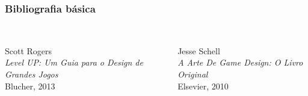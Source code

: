 \expandafter\documentclass\expandafter[table, usenames, svgnames, dvipsnames, \classopts]{beamer}
\begin{document}
\begin{frame} 
	\frametitle{\textbf{Bibliografia básica}}
	
	\begin{columns}[c]
	
			\begin{center}
				\\
				Scott Rogers\\[0.5em]
				\textit{{\large Level UP: Um Guia para o Design de Grandes Jogos}}\\[0.5em]
				{\small Blucher, 2013}
			\end{center}
			
			\begin{center}
				\\
				Jesse Schell\\[0.5em]
				\textit{{\large A Arte De Game Design: O Livro Original}}\\[0.5em]
				{\small Elsevier, 2010}
			\end{center}
			

\end{columns}
\end{frame}
\end{document}
